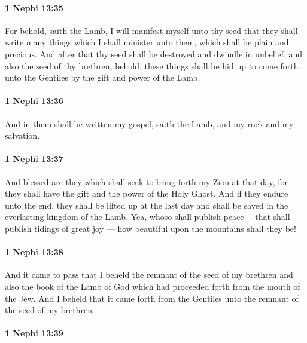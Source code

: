 		\paragraph{1 Nephi 13:35} %
			\label{1NEPHI-13-35}

			For behold, saith the Lamb, I will manifest myself unto thy seed
			that they shall write many things which I shall minister unto them,
			which shall be plain and precious.
			And after that thy seed shall be destroyed and dwindle in unbelief,
			and also the seed of thy brethren,
			behold, these things shall be hid up to come forth unto the Gentiles
			by the gift and power of the Lamb.

		\paragraph{1 Nephi 13:36} %
			\label{1NEPHI-13-36}

			And in them shall be written my gospel, saith the Lamb,
			and my rock and my salvation.

		\paragraph{1 Nephi 13:37} %
			\label{1NEPHI-13-37}

			And blessed are they which shall seek to bring forth my Zion at that day,
			for they shall have the gift and the power of the Holy Ghost.
			And if they endure unto the end,
			they shall be lifted up at the last day
			and shall be saved in the everlasting kingdom of the Lamb.
			Yea, whoso shall publish peace
			---that shall publish tidings of great joy ---
			how beautiful upon the mountains shall they be!

		\paragraph{1 Nephi 13:38} %
			\label{1NEPHI-13-38}

			And it came to pass that I beheld the remnant of the seed of my brethren
			and also the book of the Lamb of God
			which had proceeded forth from the mouth of the Jew.
			And I beheld that it came forth from the Gentiles
			unto the remnant of the seed of my brethren.

		\paragraph{1 Nephi 13:39} %
			\label{1NEPHI-13-39}

